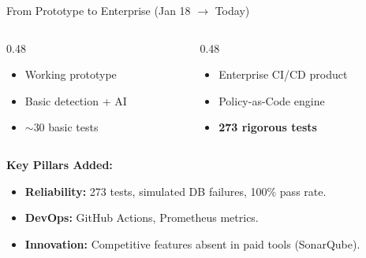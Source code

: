 \documentclass[aspectratio=169, 10pt]{beamer}
\begin{document}
\begin{frame}{From Prototype to Enterprise (Jan 18 $\rightarrow$ Today)}
  \begin{columns}[T]
    \begin{column}{0.48\textwidth}
      \begin{tcolorbox}[colback=acrLight,colframe=acrSlate,title={\textbf{Jan 18\textsuperscript{th} (v2.0)}}]
        \small
        \begin{itemize}
          \item Working prototype
          \item Basic detection + AI
          \item $\sim$30 basic tests
        \end{itemize}
      \end{tcolorbox}
    \end{column}
    \begin{column}{0.48\textwidth}
      \begin{tcolorbox}[colback=white,colframe=acrAccent,title={\textbf{Today (v2.7)}}]
        \small
        \begin{itemize}
          \item Enterprise CI/CD product
          \item Policy-as-Code engine
          \item \textbf{273 rigorous tests}
        \end{itemize}
      \end{tcolorbox}
    \end{column}
  \end{columns}
  \vspace{1em}
  \textbf{Key Pillars Added:}
  \begin{itemize}
    \item \textbf{Reliability:} 273 tests, simulated DB failures, 100\% pass rate.
    \item \textbf{DevOps:} GitHub Actions, Prometheus metrics.
    \item \textbf{Innovation:} Competitive features absent in paid tools (SonarQube).
  \end{itemize}
\end{frame}
\end{document}
